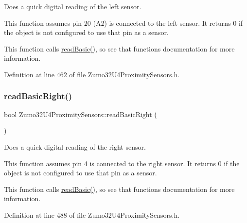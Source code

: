 Does a quick digital reading of the left sensor. 

This function assumes pin 20 (A2) is connected to the left sensor. It returns 0 if the object is not configured to use that pin as a sensor.

This function calls \hyperlink{class_zumo32_u4_proximity_sensors_a5c254dc2adf7c47203384241582349d3}{read\+Basic()}, so see that function\textquotesingle{}s documentation for more information. 

Definition at line 462 of file Zumo32\+U4\+Proximity\+Sensors.\+h.

\mbox{\label{class_zumo32_u4_proximity_sensors_a727ec0d918736c55dfb58c4495bad068}} 
\subsubsection{\texorpdfstring{read\+Basic\+Right()}{readBasicRight()}}
{\footnotesize\ttfamily bool Zumo32\+U4\+Proximity\+Sensors\+::read\+Basic\+Right (\begin{DoxyParamCaption}{ }\end{DoxyParamCaption})\hspace{0.3cm}{\ttfamily [inline]}}



Does a quick digital reading of the right sensor. 

This function assumes pin 4 is connected to the right sensor. It returns 0 if the object is not configured to use that pin as a sensor.

This function calls \hyperlink{class_zumo32_u4_proximity_sensors_a5c254dc2adf7c47203384241582349d3}{read\+Basic()}, so see that function\textquotesingle{}s documentation for more information. 

Definition at line 488 of file Zumo32\+U4\+Proximity\+Sensors.\+h.

\mbox{\label{class_zumo32_u4_proximity_sensors_a47820baf67dfa58dedb41cb7bb26dc65}} 
